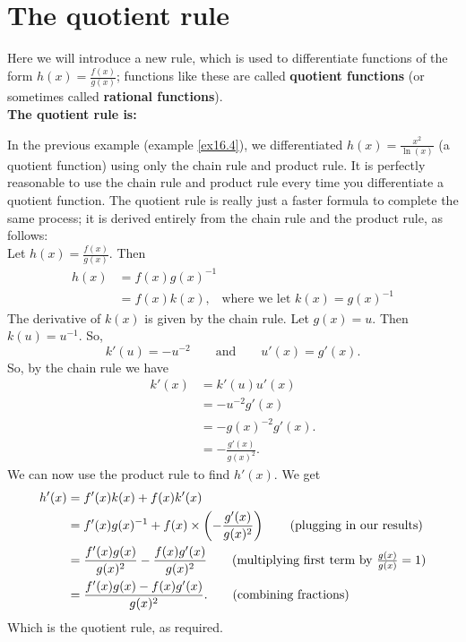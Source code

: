 \section{The quotient rule} \label{quotient rule}
Here we will introduce a new rule, which is used to differentiate functions of the form $h(x) = \frac{f(x)}{g(x)}$; functions like these are called \textbf{quotient functions} (or sometimes called \textbf{rational functions}). \\ 

\noindent \textbf{The quotient rule is:}

  	\bigskip
	
	\hfil{}
	\bigskip
	


\noindent In the previous example (example \ref{ex16.4}), we differentiated $h(x) = \frac{x^2}{\ln(x)}$ (a quotient function) using only the chain rule and product rule. It is perfectly reasonable to use the chain rule and product rule every time you differentiate a quotient function. The quotient rule is really just a faster formula to complete the same process; it is derived entirely from the chain rule and the product rule, as follows: \\

\noindent Let $h(x) = \frac{f(x)}{g(x)}$. Then
\begin{align*}
h(x) & = f(x)g(x)^{-1} \tag{index laws} \\
	& = f(x)k(x), \;\;\; \text{where we let $k(x) = g(x)^{-1}$}
\end{align*}
The derivative of $k(x)$ is given by the chain rule. Let $g(x) = u$. Then $k(u) = u^{-1}$. So,
\[
k'(u) = -u^{-2} \qquad \text{and} \qquad u'(x) = g'(x). \tag{derivative formulas}
\]
So, by the chain rule we have
\begin{align*}
k'(x) & = k'(u)u'(x) \\
	& = -u^{-2}g'(x) \tag{plugging in our results} \\
	& = -g(x)^{-2}g'(x). \tag{since $u = g(x)$} \\
	& = -\frac{g'(x)}{g(x)^2}. \tag{index laws}
\end{align*}
We can now use the product rule to find $h'(x)$. We get
\begin{align*}
h'(x) & = f'(x)k(x) + f(x)k'(x) \\
	& = f'(x)g(x)^{-1} + f(x)\times\brac{-\frac{g'(x)}{g(x)^2}} \tag{plugging in our results} \\
	& = \frac{f'(x)g(x)}{g(x)^2} - \frac{f(x)g'(x)}{g(x)^2} \tag{multiplying first term by $\frac{g(x)}{g(x)} = 1$} \\
	& = \frac{f'(x)g(x) - f(x)g'(x)}{g(x)^2}. \tag{combining fractions}
\end{align*}
Which is the quotient rule, as required.

